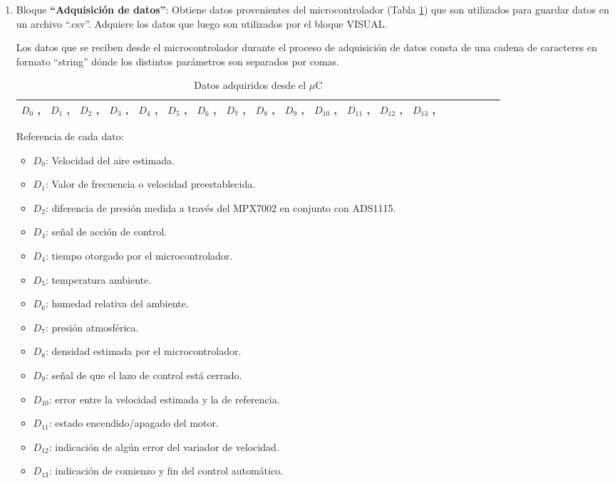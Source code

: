 \begin{enumerate}
\item Bloque \textbf{“Adquisición de datos”}: 
\subitem Obtiene datos provenientes del microcontrolador (Tabla \ref{tab:Datosdesde}) que son utilizados para guardar datos en un archivo “.csv”. 
\subitem Adquiere los datos que luego son utilizados por el bloque VISUAL.
 
Los datos que se reciben desde el microcontrolador durante el proceso de adquisición de datos consta de una cadena de caracteres en formato “string” dónde los distintos parámetros son separados por comas.
\begin{table}[H]
	\centering
	\begin{tabular}{|l|l|l|l|l|l|l|l|l|l|l|l|l|l|l|l|l|l|l|l|}
		\hline
		$D_0$ , & $D_1$ , & $D_2$ , & $D_3$ , & $D_4$ , & $D_5$ , & $D_6$ ,  & $D_7$ , & $D_8$ , & $D_9$ , & $D_{10}$ , & $D_{11}$ , & $D_{12}$ , & $D_{13}$ ,  \\ \hline
	\end{tabular}
\caption{Datos adquiridos desde el $\mu$C}
\label{tab:Datosdesde}
\end{table}

Referencia de cada dato:
	\begin{itemize}
	\item $D_0$: Velocidad del aire estimada.
	\item 	$D_1$: Valor de frecuencia o velocidad preestablecida.
	\item 	$D_2$: diferencia de presión medida a través del MPX7002 en conjunto con ADS1115.
	\item 	$D_3$: señal de acción de control.
	\item 	$D_4$: tiempo otorgado por el microcontrolador.
	\item 	$D_5$: temperatura ambiente.
	\item 	$D_6$: humedad relativa del ambiente.
	\item 	$D_7$: presión atmosférica.
	\item 	$D_8$: densidad estimada por el microcontrolador.
	\item 	$D_9$: señal de que el lazo de control está cerrado.
	\item 	$D_{10}$: error entre la velocidad estimada y la de referencia.
	\item 	$D_{11}$: estado encendido/apagado del motor.
	\item 	$D_{12}$: indicación de algún error del variador de velocidad.
	\item 	$D_{13}$: indicación de comienzo y fin del control automático.
	\end{itemize}	



\end{enumerate}
